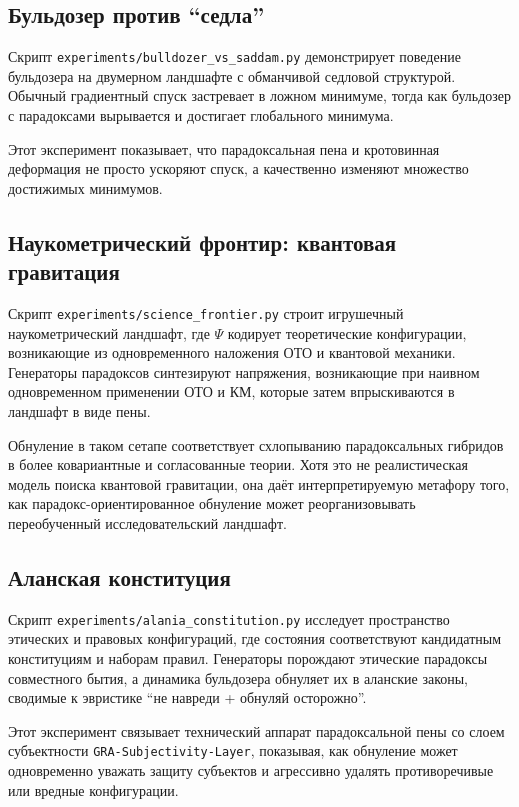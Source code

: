 \documentclass[11pt]{article}
\begin{document}
\subsection{Бульдозер против ``седла''}

Скрипт \texttt{experiments/bulldozer\_vs\_saddam.py} демонстрирует поведение бульдозера на двумерном ландшафте с обманчивой седловой структурой. 
Обычный градиентный спуск застревает в ложном минимуме, тогда как бульдозер с парадоксами вырывается и достигает глобального минимума. 

Этот эксперимент показывает, что парадоксальная пена и кротовинная деформация не просто ускоряют спуск, а качественно изменяют множество достижимых минимумов.

\subsection{Наукометрический фронтир: квантовая гравитация}

Скрипт \texttt{experiments/science\_frontier.py} строит игрушечный наукометрический ландшафт, где $\Psi$ кодирует теоретические конфигурации, возникающие из одновременного наложения ОТО и квантовой механики. 
Генераторы парадоксов синтезируют напряжения, возникающие при наивном одновременном применении ОТО и КМ, которые затем впрыскиваются в ландшафт в виде пены.

Обнуление в таком сетапе соответствует схлопыванию парадоксальных гибридов в более ковариантные и согласованные теории. 
Хотя это не реалистическая модель поиска квантовой гравитации, она даёт интерпретируемую метафору того, как парадокс-ориентированное обнуление может реорганизовывать переобученный исследовательский ландшафт.

\subsection{Аланская конституция}

Скрипт \texttt{experiments/alania\_constitution.py} исследует пространство этических и правовых конфигураций, где состояния соответствуют кандидатным конституциям и наборам правил. 
Генераторы порождают этические парадоксы совместного бытия, а динамика бульдозера обнуляет их в аланские законы, сводимые к эвристике ``не навреди + обнуляй осторожно''.

Этот эксперимент связывает технический аппарат парадоксальной пены со слоем субъектности \texttt{GRA-Subjectivity-Layer}, показывая, как обнуление может одновременно уважать защиту субъектов и агрессивно удалять противоречивые или вредные конфигурации.
\end{document}
